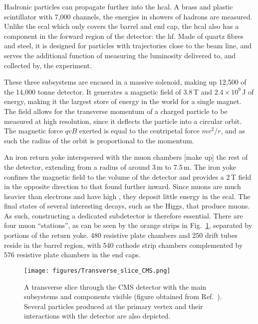 Hadronic particles can propagate further into the \acrshort{hcal}. A brass and plastic scintillator with 7,000 channels, the energies in showers of hadrons are measured. Unlike the \acrshort{ecal} which only covers the barrel and end cap, the \acrshort{hcal} also has a component in the forward region of the detector: the \acrfull{hf}. Made of quartz fibres and steel, it is designed for particles with trajectories close to the beam line, and serves the additional function of measuring the luminosity delivered to, and collected by, the experiment. %

These three subsystems are encased in a massive solenoid, making up 12,500 of the 14,000 tonne detector. It generates a magnetic field of 3.8\,T and $\text{2.4} \times \text{10}^{\text{9}}$\,J of energy, making it the largest store of energy in the world for a single magnet. The field allows for the transverse momentum of a charged particle to be measured at high resolution, since it deflects the particle into a circular orbit. The magnetic force $qvB$ exerted is equal to the centripetal force $mv^2/r$, and as such the radius of the orbit is proportional to the momentum.

An iron return yoke interspersed with the muon chambers [make up] the rest of the detector, extending from a radius of around 3\,m to 7.5\,m. The iron yoke confines the magnetic field to the volume of the detector and provides a 2\,T field in the opposite direction to that found further inward. Since muons are much heavier than electrons and have high \pt, they deposit little energy in the \acrshort{ecal}. The final states of several interesting decays, such as the Higgs, that produce muons. As such, constructing a dedicated subdetector is therefore essential. There are four muon ``stations'', as can be seen by the orange strips in Fig.~\ref{fig:detector_cms_transverse}, separated by portions of the return yoke. 480 resistive plate chambers and 250 drift tubes reside in the barrel region, with  540 cathode strip chambers complemented by 576 resistive plate chambers in the end caps.

\begin{figure}[htbp]
    \centering
    \texttt{[image: figures/Transverse\_slice\_CMS.png]}
    \caption[A transverse slice through the CMS detector with the main subsystems and components visible]{A transverse slice through the CMS detector with the main subsystems and components visible (figure obtained from Ref.~). Several particles produced at the primary vertex and their interactions with the detector are also depicted.}
    \label{fig:detector_cms_transverse}
\end{figure}

